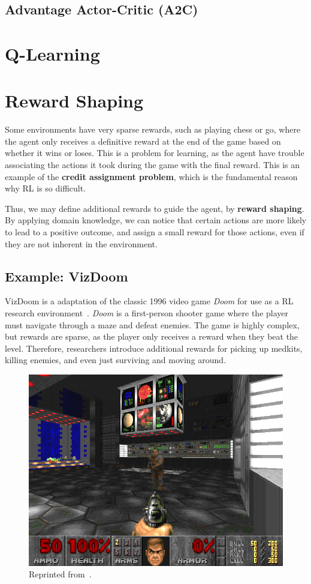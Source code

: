 \documentclass[12pt]{report}
\theoremstyle{definition}
\theoremstyle{remark}
\begin{document}
\subsection{Advantage Actor-Critic (A2C)}

\section{Q-Learning}

\section{Reward Shaping}
Some environments have very sparse rewards, such as playing chess or go, where the agent only receives a definitive reward at the end of the game based on whether it wins or loses. This is a problem for learning, as the agent have trouble associating the actions it took during the game with the final reward. This is an example of the \textbf{credit assignment problem}, which is the fundamental reason why RL is so difficult.

Thus, we may define additional rewards to guide the agent, by \textbf{reward shaping}. By applying domain knowledge, we can notice that certain actions are more likely to lead to a positive outcome, and assign a small reward for those actions, even if they are not inherent in the environment.

\subsection{Example: VizDoom}

VizDoom is a adaptation of the classic 1996 video game \textit{Doom} for use as a RL research environment~\cite{kempka_vizdoom_2016}. \textit{Doom} is a first-person shooter game where the player must navigate through a maze and defeat enemies. The game is highly complex, but rewards are sparse, as the player only receives a reward when they beat the level. Therefore, researchers introduce additional rewards for picking up medkits, killing enemies, and even just surviving and moving around.

\begin{figure}[h]
    \centering
    \includegraphics[width=0.5\linewidth]{figs/doom.png}
    \caption{Reprinted from~\cite{kempka_vizdoom_2016}.}
    \label{fig:enter-label}
\end{figure}
\end{document}
